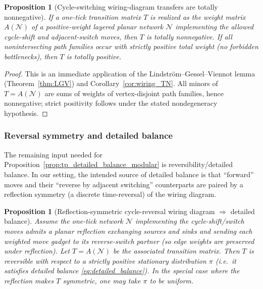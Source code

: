 \documentclass[11pt,oneside]{amsbook}
\numberwithin{equation}{section}
\theoremstyle{plain}
\newtheorem{proposition}[theorem]{Proposition}
\theoremstyle{definition}
\theoremstyle{remark}
\begin{document}
\begin{proposition}[Cycle-switching wiring-diagram transfers are totally nonnegative]
\label{prop:cycle_switching_TN}
If a one-tick transition matrix $T$ is realized as the weight matrix $A(\mathcal{N})$ of a positive-weight layered planar network $\mathcal{N}$ implementing the allowed cycle-shift and adjacent-switch moves, then $T$ is totally nonnegative.
If all nonintersecting path families occur with strictly positive total weight (no forbidden bottlenecks), then $T$ is totally positive.
\end{proposition}

\begin{proof}
This is an immediate application of the Lindstr\"om--Gessel--Viennot lemma (Theorem~\ref{thm:LGV}) and Corollary~\ref{cor:wiring_TN}.
All minors of $T=A(\mathcal{N})$ are sums of weights of vertex-disjoint path families, hence nonnegative; strict positivity follows under the stated nondegeneracy hypothesis.
\end{proof}

\subsubsection{Reversal symmetry and detailed balance}

The remaining input needed for Proposition~\ref{prop:tp_detailed_balance_modular} is reversibility/detailed balance.
In our setting, the intended source of detailed balance is that ``forward'' moves and their ``reverse by adjacent switching'' counterparts are paired by a reflection symmetry (a discrete time-reversal) of the wiring diagram.

\begin{proposition}[Reflection-symmetric cycle-reversal wiring diagram $\Rightarrow$ detailed balance]
\label{prop:cycle_reversal_detailed_balance}
Assume the one-tick network $\mathcal{N}$ implementing the cycle-shift/switch moves admits a planar reflection exchanging sources and sinks and sending each weighted move gadget to its reverse-switch partner (so edge weights are preserved under reflection).
Let $T=A(\mathcal{N})$ be the associated transition matrix.
Then $T$ is reversible with respect to a strictly positive stationary distribution $\pi$ (i.e.\ it satisfies detailed balance \eqref{eq:detailed_balance}).
In the special case where the reflection makes $T$ symmetric, one may take $\pi$ to be uniform.
\end{proposition}
\end{document}
